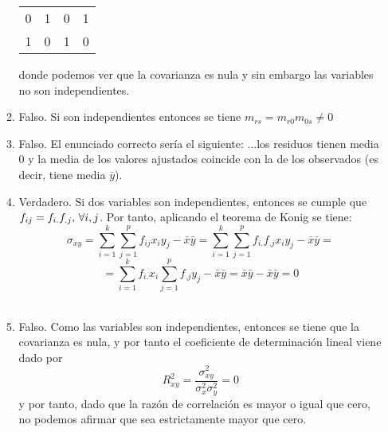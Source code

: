 \documentclass[fleqn]{article}
\begin{document}
\begin{enumerate}
\begin{enumerate}
\begin{center}
\begin{tabular}{c|c c c}
                                                                0 & 1 & 0 & 1 \\
                                                                
                                                                1 & 0 & 1 & 0 \\
                                                        \end{tabular}
                                                \end{center}
                                                donde podemos ver que la covarianza es nula y sin embargo las variables no son independientes.\\
                                \item Falso. Si son independientes entonces se tiene $m_{rs} = m_{r0} m_{0s} \neq 0$\\
                                \item Falso. El enunciado correcto sería el siguiente: ...los residuos tienen media 0 y la media de los valores
                                                ajustados coincide con la de los observados (es decir, tiene media $\bar{y}$).\\
                                \item Verdadero. Si dos variables son independientes, entonces se cumple que $f_{ij} = f_{i.} f_{.j}, \thinspace \forall i, j$.
                                                Por tanto, aplicando el teorema de Konig se tiene:
                                                $$\sigma_{xy} = \sum_{i=1}^k \sum_{j=1}^p f_{ij} x_i y_j - \bar{x} \bar{y} = 
                                                \sum_{i=1}^k \sum_{j=1}^p f_{i.} f_{.j} x_i y_j - \bar{x} \bar{y} = $$
                                                $$= \sum_{i=1}^k f_{i.} x_i \sum_{j=1}^p f_{.j} y_j - \bar{x} \bar{y} = \bar{x} \bar{y} - \bar{x} \bar{y} = 0$$\\
                                \item Falso. Como las variables son independientes, entonces se tiene que la covarianza es nula, y por tanto el coeficiente
                                                de determinación lineal viene dado por 
                                                $$R^2_{xy} = \frac{\sigma_{xy}^2}{\sigma_x^2 \sigma_y^2} = 0$$
                                                y por tanto, dado que la razón de correlación es mayor o igual que cero, no podemos afirmar que sea estrictamente 
                                                mayor que cero.\\

\end{enumerate}
\end{enumerate}
\end{document}
